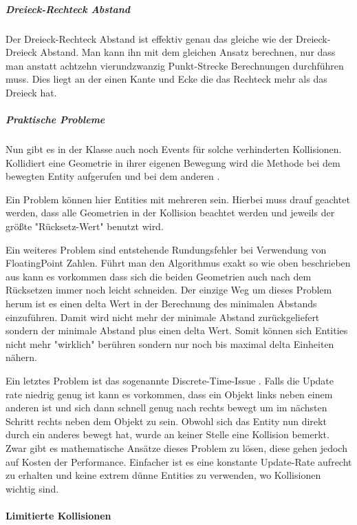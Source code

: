 \subparagraph{Dreieck-Rechteck Abstand}

Der Dreieck-Rechteck Abstand ist effektiv genau das gleiche wie der Dreieck-Dreieck Abstand. Man kann ihn mit dem gleichen Ansatz berechnen, nur dass man anstatt achtzehn vierundzwanzig Punkt-Strecke Berechnungen durchführen muss. Dies liegt an der einen Kante und Ecke die das Rechteck mehr als das Dreieck hat.

\subparagraph{Praktische Probleme}

Nun gibt es in der Klasse  auch noch Events für solche verhinderten Kollisionen. Kollidiert eine Geometrie in ihrer eigenen Bewegung wird die Methode  bei dem bewegten Entity aufgerufen und bei dem anderen .

Ein Problem können hier Entities mit mehreren  sein. Hierbei muss drauf geachtet werden, dass alle Geometrien in der Kollision beachtet werden und jeweils der größte "Rücksetz-Wert" benutzt wird.

Ein weiteres Problem sind entstehende Rundungsfehler bei Verwendung von FloatingPoint Zahlen. Führt man den Algorithmus exakt so wie oben beschrieben aus kann es vorkommen dass sich die beiden Geometrien auch nach dem Rücksetzen immer noch leicht schneiden. Der einzige Weg um dieses Problem herum ist es einen delta Wert in der Berechnung des minimalen Abstands einzuführen. Damit wird nicht mehr der minimale Abstand zurückgeliefert sondern der minimale Abstand plus einen delta Wert. Somit können sich Entities nicht mehr "wirklich" berühren sondern nur noch bis maximal delta Einheiten nähern.

Ein letztes Problem ist das sogenannte Discrete-Time-Issue \cite[S 503]{DGIJ}. Falls die Update rate niedrig genug ist kann es vorkommen, dass ein Objekt links neben einem anderen ist und sich dann schnell genug nach rechts bewegt um im nächsten Schritt rechts neben dem Objekt zu sein. Obwohl sich das Entity nun direkt durch ein anderes bewegt hat, wurde an keiner Stelle eine Kollision bemerkt. Zwar gibt es mathematische Ansätze dieses Problem zu lösen, diese gehen jedoch auf Kosten der Performance. Einfacher ist es eine konstante Update-Rate aufrecht zu erhalten und keine extrem dünne Entities zu verwenden, wo Kollisionen wichtig sind.


\paragraph{Limitierte Kollisionen}

